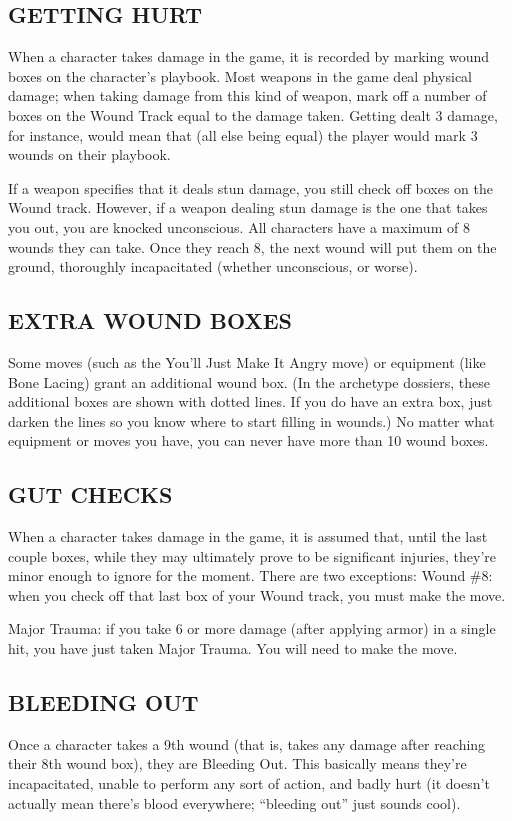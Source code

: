 \subsection*{GETTING HURT}
When a character takes damage in the game, it is recorded by marking wound boxes on the character’s playbook. Most weapons in the game deal physical damage; when taking damage from this kind of weapon, mark off a number of boxes on the Wound Track equal to the damage taken. Getting dealt 3 damage, for instance, would mean that (all else being equal) the player would mark 3 wounds on their playbook.

If a weapon specifies that it deals stun damage, you still check off boxes on the Wound track. However, if a weapon dealing stun damage is the one that takes you out, you are knocked unconscious. All characters have a maximum of 8 wounds they can take. Once they reach 8, the next wound will put them on the ground, thoroughly incapacitated (whether unconscious, or worse).


\subsection*{EXTRA WOUND BOXES}
Some moves (such as the You’ll Just Make It Angry move) or equipment (like Bone Lacing) grant an additional wound box. (In the archetype dossiers, these additional boxes are shown with dotted lines. If you do have an extra box, just darken the lines so you know where to start filling in wounds.) No matter what equipment or moves you have, you can never have more than 10 wound boxes.


\subsection*{GUT CHECKS}

When a character takes damage in the game, it is assumed that, until the last couple boxes, while they may ultimately prove to be significant injuries, they’re minor enough to ignore for the moment. There are two exceptions: Wound \#8: when you check off that last box of your Wound track, you must make the  move.

Major Trauma: if you take 6 or more damage (after applying armor) in a single hit, you have just taken Major Trauma. You will need to make the  move.


\subsection*{BLEEDING OUT}
Once a character takes a 9th wound (that is, takes any damage after reaching their 8th wound box), they are Bleeding Out. This basically means they’re incapacitated, unable to perform any sort of action, and badly hurt (it doesn’t actually mean there’s blood everywhere; “bleeding out” just sounds cool).

